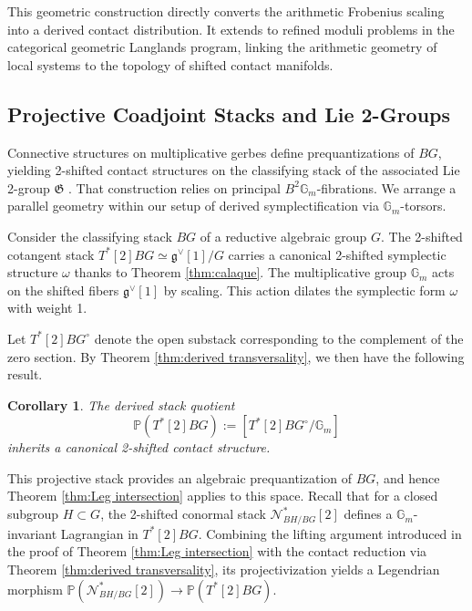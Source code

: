 \documentclass[reqno]{amsart}
\newtheorem{corollary}[theorem]{Corollary}
\theoremstyle{definition}
\theoremstyle{remark}
\newcommand{\Gm}{\mathbb{G}_m}
\begin{document}
{This geometric construction directly converts the arithmetic Frobenius scaling into a derived contact distribution. It extends to refined moduli problems in the categorical geometric Langlands program, linking the arithmetic geometry of local systems to the topology of shifted contact manifolds.

\subsection{Projective Coadjoint Stacks and Lie 2-Groups}

Connective structures on multiplicative gerbes define prequantizations of $BG$, yielding 2-shifted contact structures on the classifying stack of the associated Lie 2-group $\mathfrak{G}$ \cite[Section 3.4.2]{Tellez}. That construction relies on principal $B^2\Gm$-fibrations. We arrange a parallel geometry within our setup of derived symplectification via $\Gm$-torsors.
\vspace{1in}

Consider the classifying stack $BG$ of a reductive algebraic group $G$. The 2-shifted cotangent stack $T^*[2]BG \simeq \mathfrak{g}^\vee[1]/G$ carries a canonical 2-shifted symplectic structure  $\omega$ thanks to Theorem \ref{thm:calaque}. The multiplicative group $\Gm$ acts on the shifted fibers $\mathfrak{g}^\vee[1]$ by scaling. This action dilates the symplectic form $\omega$ with weight 1.

Let $T^*[2]BG^\circ$ denote the open substack corresponding to the complement of the zero section. By Theorem \ref{thm:derived transversality}, we then have the following result.

\begin{corollary} \label{cor: Lie 2-group}
  The derived stack quotient
  \begin{equation*}
    \mathbb{P}(T^*[2]BG) := [T^*[2]BG^\circ / \Gm]
  \end{equation*}
  inherits a canonical 2-shifted contact structure.
\end{corollary}

This projective stack provides an algebraic prequantization of $BG$, and hence Theorem \ref{thm:Leg intersection} applies to this space. Recall that for a closed subgroup $H \subset G$, the 2-shifted conormal stack $\mathcal{N}^*_{BH/BG}[2]$ defines a $\Gm$-invariant Lagrangian in $T^*[2]BG$. Combining the lifting argument introduced in the proof of Theorem \ref{thm:Leg intersection} with the contact reduction via Theorem \ref{thm:derived transversality}, its projectivization yields a Legendrian morphism $\mathbb{P}(\mathcal{N}^*_{BH/BG}[2]) \to \mathbb{P}(T^*[2]BG)$. 

}
\end{document}
